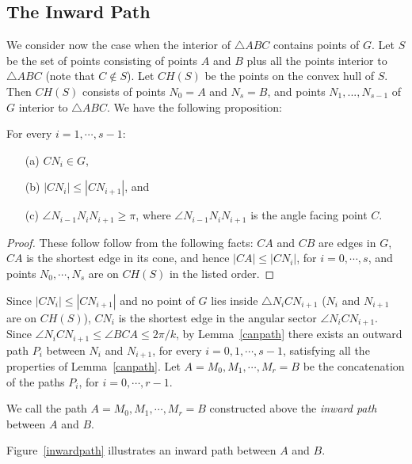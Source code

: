 \documentclass{stacs_proc}
\theoremstyle{plain}\newtheorem{satz}[thm]{Satz}
\begin{document}
\subsection{The Inward Path}
\label{inwardpatheuclidean} We consider now the case when the
interior of $\triangle{ABC}$ contains points of $G$. Let $S$ be the
set of points consisting of points $A$ and $B$ plus all the points
interior to $\triangle{ABC}$ (note that $C \notin S$). Let $CH(S)$
be the points on the convex hull of $S$. Then $CH(S)$ consists of
points $N_0=A$ and $N_s = B$, and points $N_1, ..., N_{s-1}$ of $G$
interior to $\triangle{ABC}$. We have the following proposition:


\begin{proposition}
\label{inwardproperties} For every $i =1, \cdots, s-1:$
\begin{itemize}
\item[(a)] $CN_i \in G$,
\item[(b)] $|CN_i| \leq |CN_{i+1}|$, and
\item[(c)] $\angle{N_{i-1}N_iN_{i+1}} \geq \pi$, where $\angle{N_{i-1}N_iN_{i+1}}$ is the angle facing point
$C$.
\end{itemize}
\begin{proof}
These follow follow from the following facts: $CA$ and $CB$ are edges in $G$,
$CA$ is the shortest edge in its cone, and hence $|CA| \leq |CN_i|$, for $i=0,
\cdots, s$, and points $N_0, \cdots, N_s$ are on $CH(S)$ in the listed order.
\end{proof}
\end{proposition}

Since $|CN_i| \leq |CN_{i+1}|$ and no point of $G$ lies inside
$\triangle{N_iCN_{i+1}}$ ($N_i$ and $N_{i+1}$ are on $CH(S)$),
$CN_i$ is the shortest edge in the angular sector
$\angle{N_iCN_{i+1}}$. Since $\angle{N_iCN_{i+1}} \leq
\angle{BCA}\leq 2\pi/k$, by Lemma~\ref{canpath} there exists an
outward path $P_i$ between $N_i$ and $N_{i+1}$, for every $i = 0, 1,
\cdots, s-1$, satisfying all the properties of Lemma~\ref{canpath}.
Let $A=M_0, M_1, \cdots, M_r=B$ be the concatenation of the paths
$P_i$, for $i=0, \cdots, r-1$.

\begin{definition}\rm
\label{inwardpathDEF} We call the path $A=M_0, M_1, \cdots, M_r=B$
constructed above the {\em inward path} between $A$ and $B$.
\end{definition}
Figure~\ref{inwardpath} illustrates an inward path between $A$ and
$B$.
\end{document}
